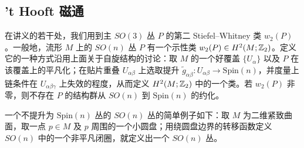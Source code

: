 

\subsection{'t Hooft 磁通}

在讲义的若干处，我们用到主 $SO(3)$ 丛 $P$ 的第二 Stiefel--Whitney 类 $w_{2}(P)$。一般地，流形 $M$ 上的 $SO(n)$ 丛 $P$ 有一个示性类 $w_{2}(P)\in H^{2}(M;\mathbb{Z}_{2})$。定义它的一种方式沿用上面关于自旋结构的讨论：取 $M$ 的一个好覆盖 $\{U_{\alpha}\}$ 以及 $P$ 在该覆盖上的平凡化；在贴片重叠 $U_{\alpha\beta}$ 上选取提升 $\tilde g_{\alpha\beta}:U_{\alpha\beta}\to\mathrm{Spin}(n)$，并度量上链条件在 $U_{\alpha\beta\gamma}$ 上失效的程度，从而定义 $H^{2}(M;\mathbb{Z}_{2})$ 中的一个类。若 $w_{2}(P)$ 非零，则不存在 $P$ 的结构群从 $SO(n)$ 到 $\mathrm{Spin}(n)$ 的约化。

一个不提升为 $\mathrm{Spin}(n)$ 丛的 $SO(n)$ 丛的简单例子如下：取 $M$ 为二维紧致曲面，取一点 $p\in M$ 及 $p$ 周围的一个小圆盘；用绕圆盘边界的转移函数定义 $SO(n)$ 中的一个非平凡闭圈，就定义出一个 $SO(n)$ 丛。


